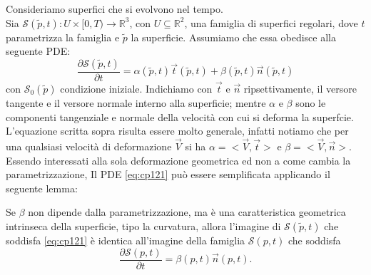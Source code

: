 Consideriamo superfici che si evolvono nel tempo. \\
Sia $\mathcal{S}(\tilde{p},t):U\times[0,T)\longrightarrow\mathbb{R}^3$, con $U\subseteq\mathbb{R}^2$, una famiglia di superfici regolari, dove $t$ parametrizza la famiglia e $\tilde{p}$ la superficie. Assumiamo che essa obedisce alla seguente PDE:
\begin{equation}
  \label{eq:cp121}
  \frac{\partial\mathcal{S}(\tilde{p},t)}{\partial t} = \alpha(\tilde{p},t)\vec{t}(\tilde{p},t) + \beta(\tilde{p},t)\vec{n}(\tilde{p},t)
\end{equation}
con $\mathcal{S}_0(\tilde{p})$ condizione iniziale. Indichiamo con $\vec{t}$ e $\vec{n}$ ripsettivamente, il versore tangente e il versore normale interno alla superficie; mentre $\alpha$ e $\beta$ sono le componenti tangenziale e normale della velocità con cui si deforma la superfcie. L'equazione scritta sopra risulta essere molto generale, infatti notiamo che per una qualsiasi velocità di deformazione $\vec{V}$ si ha $\alpha=<\vec{V},\vec{t}>$ e $\beta=<\vec{V},\vec{n}>$. Essendo interessati alla sola deformazione geometrica ed non a come cambia la parametrizzazione, Il PDE \eqref{eq:cp121} può essere semplificata applicando il seguente lemma:
\begin{lemma}
\label{lemm:cp-121}
Se $\beta$ non dipende dalla parametrizzazione, ma è una caratteristica geometrica intrinseca della superficie, tipo la curvatura, allora l'imagine di $\mathcal{S}(\tilde{p},t)$ che soddisfa \eqref{eq:cp121} è identica all'imagine della famiglia $\mathcal{S}(p,t)$ che soddisfa
\begin{equation}
  \label{eq:cp122}
  \frac{\partial\mathcal{S}(p,t)}{\partial t} =\beta(p,t)\vec{n}(p,t).
\end{equation}
\end{lemma}

